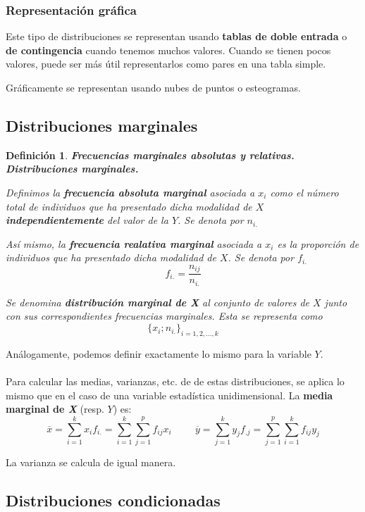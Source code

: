 \documentclass[10pt, a4paper]{article}
\theoremstyle{theorem-style}
\theoremstyle{definition-style}
\newtheorem{ndef}{Definición}[section]
\theoremstyle{remark-style}
\theoremstyle{example-style}
\theoremstyle{definition-style}
\theoremstyle{remark-style}
\begin{document}
\subsubsection{Representación gráfica}
Este tipo de distribuciones se representan usando \textbf{tablas de doble entrada} o \textbf{de contingencia} cuando tenemos muchos valores. Cuando se tienen pocos valores,
puede ser más útil representarlos como pares en una tabla simple.



Gráficamente se representan usando nubes de puntos o esteogramas.
\pagebreak
\subsection{Distribuciones marginales}

\begin{ndef}
\textbf{Frecuencias marginales absolutas y relativas. Distribuciones marginales.}

Definimos la \textbf{frecuencia absoluta marginal} asociada a $x_i$ como el número
total de individuos que ha presentado dicha modalidad de $X$
\textbf{independientemente} del valor de la $Y$. Se denota por $n_{i.}$

Así mismo, la \textbf{frecuencia realativa marginal} asociada a $x_i$ es la proporción
de individuos que ha presentado dicha modalidad de $X$. Se denota por $f_{i.}$
$$f_{i.} = \frac{n_{ij}}{n_{i.}}$$	

Se denomina \textbf{ distribución marginal de \emph{X}}  al conjunto de valores de $X$
junto con sus correspondientes frecuencias marginales. Esta se representa como
$${\{x_i;n_{i.}\}}_{i = 1,2,\dots,k}$$
\end{ndef}

Análogamente, podemos definir exactamente lo mismo para la variable $Y$.\\
\hspace{1cm}\\
Para calcular las medias, varianzas, etc. de de estas distribuciones, se aplica lo
mismo que en el caso de una variable estadística unidimensional. La \textbf{media marginal de \emph{X}} (resp. $Y$) es: $$ \overline{x} =
\sum_{i=1}^k x_i f_{i.} =\sum_{i=1}^{k} \sum_{j=1}^{p} f_{ij} x_i \hspace{1cm}
\overline{y} = \sum_{j=1}^k y_j f_{.j} =\sum_{j=1}^{p} \sum_{i=1}^{k} f_{ij}
y_j$$

La varianza se calcula de igual manera.

\subsection{Distribuciones condicionadas}
\end{document}
